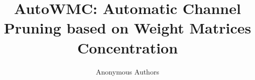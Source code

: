 \documentclass[sigconf, 10pt]{acmart}
\begin{document}
\title{AutoWMC: Automatic Channel Pruning based on Weight Matrices Concentration}



\author{Anonymous Authors}






\renewcommand{\shortauthors}{Anonymous Author A and Anonymous Author B, et al.}
\end{document}
